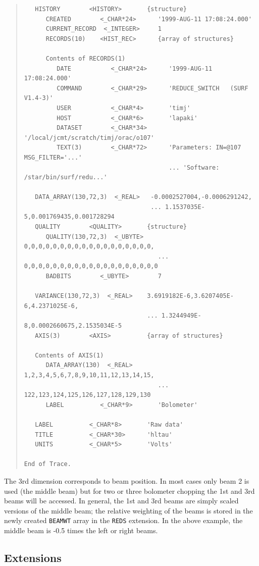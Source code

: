 \documentclass[twoside,11pt]{article}
\newenvironment{myquote}{\begin{quote}\begin{small}}{\end{small}\end{quote}}
\renewcommand{\_}{\texttt{\symbol{95}}}
\begin{document}
\begin{myquote}
\begin{verbatim}
   HISTORY        <HISTORY>       {structure}
      CREATED        <_CHAR*24>      '1999-AUG-11 17:08:24.000'
      CURRENT_RECORD  <_INTEGER>     1
      RECORDS(10)    <HIST_REC>      {array of structures}

      Contents of RECORDS(1)
         DATE           <_CHAR*24>      '1999-AUG-11 17:08:24.000'
         COMMAND        <_CHAR*29>      'REDUCE_SWITCH   (SURF V1.4-3)'
         USER           <_CHAR*4>       'timj'
         HOST           <_CHAR*6>       'lapaki'
         DATASET        <_CHAR*34>      '/local/jcmt/scratch/timj/orac/o107'
         TEXT(3)        <_CHAR*72>      'Parameters: IN=@107 MSG_FILTER='...'
                                        ... 'Software: /star/bin/surf/redu...'

   DATA_ARRAY(130,72,3)  <_REAL>   -0.0002527004,-0.0006291242,
                                   ... 1.1537035E-5,0.001769435,0.001728294
   QUALITY        <QUALITY>       {structure}
      QUALITY(130,72,3)  <_UBYTE>    0,0,0,0,0,0,0,0,0,0,0,0,0,0,0,0,0,0,
                                     ... 0,0,0,0,0,0,0,0,0,0,0,0,0,0,0,0,0,0,0
      BADBITS        <_UBYTE>        7

   VARIANCE(130,72,3)  <_REAL>    3.6919182E-6,3.6207405E-6,4.2371025E-6,
                                  ... 1.3244949E-8,0.0002660675,2.1535034E-5
   AXIS(3)        <AXIS>          {array of structures}

   Contents of AXIS(1)
      DATA_ARRAY(130)  <_REAL>       1,2,3,4,5,6,7,8,9,10,11,12,13,14,15,
                                     ... 122,123,124,125,126,127,128,129,130
      LABEL          <_CHAR*9>       'Bolometer'

   LABEL          <_CHAR*8>       'Raw data'
   TITLE          <_CHAR*30>      'hltau'
   UNITS          <_CHAR*5>       'Volts'

End of Trace.
\end{verbatim}
\end{myquote}

The 3rd dimension corresponds to beam position. In most cases only beam 2 is
used (the middle beam) but for two or three  bolometer chopping the 1st and
3rd beams will be accessed. In general, the 1st and 3rd beams are simply
scaled versions of the middle beam; the relative weighting of the beams is
stored in the newly created \texttt{BEAM\_WT} array in the \texttt{REDS}
extension. In the above example, the middle beam is -0.5 times the left or
right beams.



\subsection{Extensions\label{scu:ext}}
\end{document}
